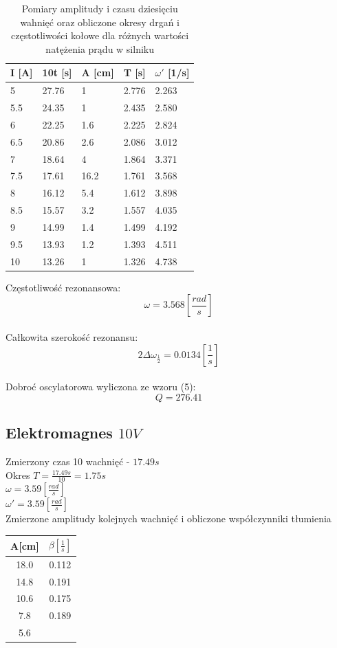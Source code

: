 \documentclass[]{article}
\begin{document}
	\begin{table}[h]
		\centering
		\caption{Pomiary amplitudy i czasu dziesięciu wahnięć oraz obliczone okresy drgań i częstotliwości kołowe dla różnych wartości natężenia prądu w silniku}
		\begin{tabular}{|l|l|l|l|l|}
			\hline
			
			I [A] & 10t [s] & A [cm] & T [s] & $\omega'$ [1/s] \\ \hline
			5 & 27.76 & 1 & 2.776 & 2.263 \\ \hline
			5.5 & 24.35 & 1 & 2.435 & 2.580 \\ \hline
			6 & 22.25 & 1.6 & 2.225 & 2.824 \\ \hline
			6.5 & 20.86 & 2.6 & 2.086 & 3.012 \\ \hline
			7 & 18.64 & 4 & 1.864 & 3.371 \\ \hline
			7.5 & 17.61 & 16.2 & 1.761 & 3.568 \\ \hline
			8 & 16.12 & 5.4 & 1.612 & 3.898 \\ \hline
			8.5 & 15.57 & 3.2 & 1.557 & 4.035 \\ \hline
			9 & 14.99 & 1.4 & 1.499 & 4.192 \\ \hline
			9.5 & 13.93 & 1.2 & 1.393 & 4.511 \\ \hline
			10 & 13.26 & 1 & 1.326 & 4.738 \\ \hline
			
		\end{tabular}
	\end{table}
	
	Częstotliwość rezonansowa:
	$$\omega = 3.568 \left[ \frac{rad}{s}\right]$$\\
	Całkowita szerokość rezonansu:
	$$2\Delta\omega_{\frac{1}{2}} = 0.0134 \left[ \frac{1}{s}\right] $$\\	
	Dobroć oscylatorowa wyliczona ze wzoru (5):
	$$Q = 276.41$$
	
	
	\subsection{Elektromagnes $10V$}
	Zmierzony czas 10 wachnięć - $17.49s$\\
	Okres $T=\frac{17.49s}{10} = 1.75s$\\
	$\omega = 3.59 \left[ \frac{rad}{s}\right]$\\
	$\omega' = 3.59 \left[ \frac{rad}{s}\right]$\\
	Zmierzone amplitudy kolejnych wachnięć i obliczone współczynniki tłumienia
	\begin{table}[h]
		\begin{tabular}{|c|c|}
			\hline 
			A[cm] & $\beta\left[ \frac{1}{s}\right] $ \\ 
			\hline 
			18.0 & 0.112 \\ 
			\hline 
			14.8 & 0.191 \\ 
			\hline 
			10.6 & 0.175 \\ 
			\hline 
			7.8 & 0.189 \\ 
			\hline 
			5.6 &  \\ 
			\hline 
		\end{tabular} 
	\end{table}
\end{document}
